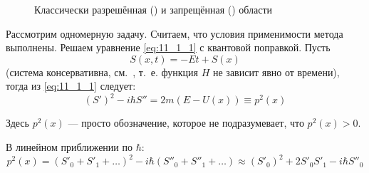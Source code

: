 \begin{figure}
\centering
{}
\caption{Классически разрешённая () и запрещённая () области} \label{fig:11_1}
\end{figure}

Рассмотрим одномерную задачу. Считаем, что условия применимости метода выполнены. Решаем уравнение \eqref{eq:11_1_1} с квантовой поправкой. Пусть 
$$
S(x,t) = -Et + S(x)
$$
(система консервативна, см.~, т.~е. функция $H$ не зависит явно от времени), тогда из \eqref{eq:11_1_1} следует:
$$
(S')^2 - i\hbar S'' = 2m(E-U(x)) \equiv p^2(x)
$$

Здесь $p^2(x)$ --- просто обозначение, которое не подразумевает, что ${p^2(x) > 0}$.

В линейном приближении по $\hbar$:
$$
p^2(x) = (S'_0 + S'_1 + \dots)^2 - i\hbar(S''_0+S''_1+\dots) \approx (S'_0)^2 + 2 S'_0 S'_1 - i\hbar S''_0
$$

